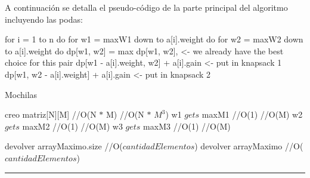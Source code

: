 A continuaci\'on se detalla el pseudo-c\'odigo de la parte principal del algoritmo incluyendo las podas:

for i = 1 to n do
  for w1 = maxW1 down to a[i].weight do
    for w2 = maxW2 down to a[i].weight do
      dp[w1, w2] = max
                   {
                       dp[w1, w2], <- we already have the best choice for this pair
                       dp[w1 - a[i].weight, w2] + a[i].gain <- put in knapsack 1
                       dp[w1, w2 - a[i].weight] + a[i].gain <- put in knapsack 2
                   }



\begin{algorithm}[H]
\caption{Mochilas}
\begin{algorithmic}[1]
\state creo matriz[N][M] \hfill //O(N $\ast$ M)
 \hfill //O(N $\ast$ $M^{3}$)
\state w1 $gets$ maxM1 \hfill //O(1)
 \hfill //O(M)
\state w2 $gets$ maxM2 \hfill //O(1)
 \hfill //O(M)
\state w3 $gets$ maxM3 \hfill //O(1)
 \hfill //O(M)

\endwhile
\endwhile
\endwhile
\endwhile
\state devolver arrayMaximo.size \hfill //O($cantidadElementos$)
\state devolver arrayMaximo \hfill //O($cantidadElementos$)
\EndFunction 
\end{algorithmic}
\hrule
{}
\end{algorithm}
